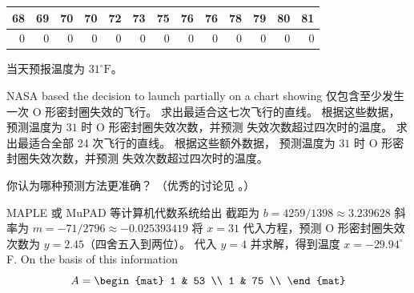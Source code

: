 \begin{exercises}
\begin{center}
      \hspace*{3em}\begin{tabular}{|rrrrrrrrrrrrr}
                68 &69 &70 &70 &72 &73 &75 &76 &76 &78 &79 &80 &81\\
         \hline
                0  &0  &0  &0  &0  &0  &0  &0  &0  &0  &0  &0  &0
      \end{tabular}
    \end{center}
    当天预报温度为 \(31^\circ\text{F}\)。
    \begin{exparts}
      \partsitem NASA based the decision to launch partially on a chart showing
        仅包含至少发生一次 O 形密封圈失效的飞行。
        求出最适合这七次飞行的直线。
        根据这些数据，
        预测温度为 $31$ 时 O 形密封圈失效次数，并预测
        失效次数超过四次时的温度。
      \partsitem 求出最适合全部 24 次飞行的直线。
        根据这些额外数据，
        预测温度为 $31$ 时 O 形密封圈失效次数，并预测
        失效次数超过四次时的温度。
    \end{exparts}
    你认为哪种预测方法更准确？
    （优秀的讨论见 \cite{Stats}。）
    \begin{answer}
      \begin{exparts}
        \partsitem MAPLE 或 MuPAD 等计算机代数系统给出
          截距为 $b=4259/1398\approx 3.239628$
          斜率为 $m=-71/2796\approx -0.025393419$     
          将 $x=31$ 代入方程，预测
          O 形密封圈失效次数为 $y=2.45$（四舍五入到两位）。
          代入 $y=4$ 并求解，得到温度
          $x=-29.94^\circ$F.
        \partsitem On the basis of this information
          \begin{equation*}
            A =  
            \begin{mat}
               1 & 53 \\
               1 & 75 \\

\end{mat}
\end{equation*}
\end{exparts}
\end{answer}
\end{exercises}
